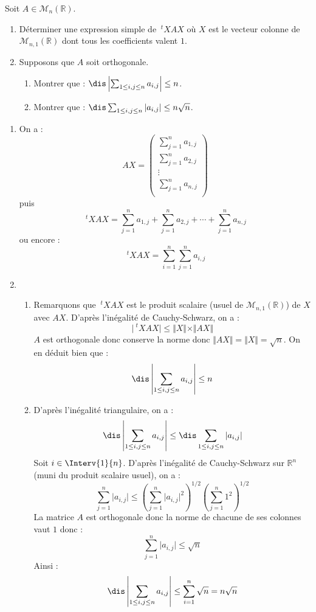 \documentclass[a4paper,10pt]{report}
\begin{document}
\begin{Exercice}{} Soit $A \in \mathcal{M}_n(\mathbb{R})$.

\begin{enumerate}
\item Déterminer une expression simple de $~^tX A X$ où $X$ est le vecteur colonne de $\mathcal{M}_{n,1}(\mathbb{R})$ dont tous les coefficients valent $1$.  
\item Supposons que $A$ soit orthogonale.
\begin{enumerate}
\item Montrer que : $\dis \left\vert \sum_{1 \leq i,j \leq n} a_{i,j} \right\vert \leq n$.
\item Montrer que : $\dis  \sum_{1 \leq i,j \leq n} \vert a_{i,j} \vert  \leq n \sqrt{n}$.
\end{enumerate}
\end{enumerate}
\end{Exercice}

\corr

\begin{enumerate}
\item On a :
$$ AX = \begin{pmatrix}
\sum_{j=1}^n a_{1,j} \\
\sum_{j=1}^n a_{2,j} \\ 
\vdots \\
\sum_{j=1}^n a_{n,j} \\
\end{pmatrix}$$
puis 
$$ ~^tX A X =\sum_{j=1}^n a_{1,j} + \sum_{j=1}^n a_{2,j} + \cdots + \sum_{j=1}^n a_{n,j}$$
ou encore :
$$  ~^tX A X = \sum_{i=1}^n \sum_{j=1}^n a_{i,j}$$
\item
\begin{enumerate}
\item Remarquons que $~^tX A X$ est le produit scalaire (usuel de $\mathcal{M}_{n,1}(\mathbb{R})$) de $X$ avec $AX$. D'après l'inégalité de Cauchy-Schwarz, on a :
$$ \vert ~^tX A X \vert \leq \Vert X \Vert \times \Vert AX \Vert$$
$A$ est orthogonale donc conserve la norme donc $\Vert AX \Vert = \Vert X \Vert = \sqrt{n}$. On en déduit bien que :
$$ \dis \left\vert \sum_{1 \leq i,j \leq n} a_{i,j} \right\vert \leq n$$
\item D'après l'inégalité triangulaire, on a :
$$ \dis \left\vert \sum_{1 \leq i,j \leq n} a_{i,j} \right\vert \leq \dis  \sum_{1 \leq i,j \leq n} \vert a_{i,j}  \vert$$
Soit $i \in \Interv{1}{n}$. D'après l'inégalité de Cauchy-Schwarz sur $\mathbb{R}^n$ (muni du produit scalaire usuel), on a :
$$ \sum_{j=1}^n \vert a_{i,j}  \vert \leq \left(\sum_{j=1}^n \vert a_{i,j}  \vert^2 \right)^{1/2}  \left(\sum_{j=1}^n 1^2 \right)^{1/2}$$
La matrice $A$ est orthogonale donc la norme de chacune de ses colonnes vaut $1$ donc :
$$  \sum_{j=1}^n \vert a_{i,j}  \vert \leq  \sqrt{n}$$
Ainsi :
$$ \dis \left\vert \sum_{1 \leq i,j \leq n} a_{i,j} \right\vert \leq \sum_{i=1}^n \sqrt{n} = n \sqrt{n}$$
\end{enumerate}
\end{enumerate}
\end{document}
